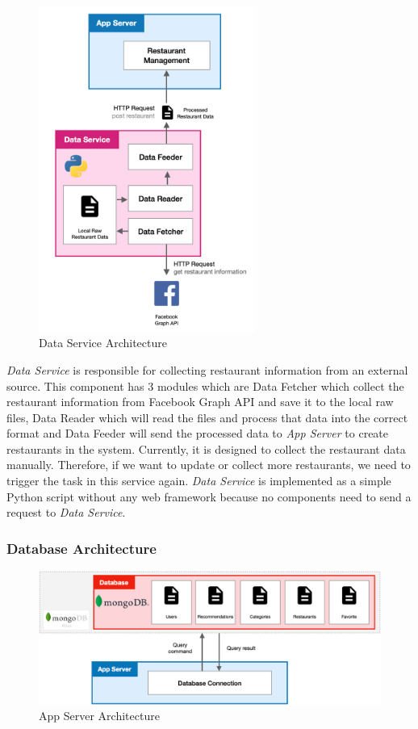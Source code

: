 \documentclass[12pt,oneside,openright,a4paper]{cpe-english-project}
\begin{document}
\begin{figure}[H]\centering
\includegraphics[width=200pt]{./images/3arch_dataservice.png}
\caption{Data Service Architecture}\label{fig:3arch_dataservice}
\end{figure}\vspace{-24pt}

\textit{Data Service} is responsible for collecting restaurant information from an external source. This component has 3 modules which are Data Fetcher which collect the restaurant information from Facebook Graph API and save it to the local raw files, Data Reader which will read the files and process that data into the correct format and Data Feeder will send the processed data to \textit{App Server} to create restaurants in the system. Currently, it is designed to collect the restaurant data manually. Therefore, if we want to update or collect more restaurants, we need to trigger the task in this service again. \textit{Data Service} is implemented as a simple Python script without any web framework because no components need to send a request to \textit{Data Service}.

\subsubsection{Database Architecture}

\begin{figure}[H]\centering
\includegraphics[width=400pt]{./images/3arch_database.png}
\caption{App Server Architecture}\label{fig:3arch_database}
\end{figure}\vspace{-24pt}
\end{document}
